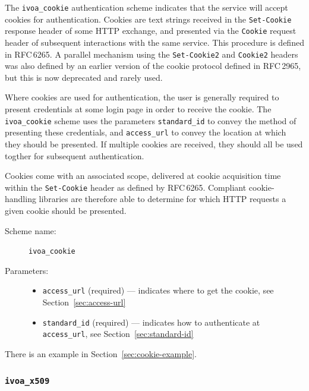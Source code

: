 \documentclass[11pt,a4paper]{ivoa}
\newcommand{\rfc}[1]{RFC\,#1}
\begin{document}
The \verb|ivoa_cookie| authentication scheme indicates that the service
will accept cookies for authentication.
Cookies are text strings received in the {\tt Set-Cookie}
response header of some HTTP exchange,
and presented via the {\tt Cookie} request header of subsequent
interactions with the same service.
This procedure is defined in \rfc{6265}.
A parallel mechanism using the {\tt Set-Cookie2} and {\tt Cookie2}
headers was also defined by an earlier version of the cookie protocol
defined in \rfc{2965}, but this is now deprecated and rarely used.

Where cookies are used for authentication, the user is generally required
to present credentials at some login page in order to receive the cookie.
The \verb|ivoa_cookie| scheme uses the parameters 
\verb|standard_id| to convey the method of presenting these credentials, and
\verb|access_url| to convey the location at which they should be presented.
If multiple cookies are received, they should all be used togther
for subsequent authentication.

Cookies come with an associated scope,
delivered at cookie acquisition time within the {\tt Set-Cookie} header
as defined by \rfc{6265}.
Compliant cookie-handling libraries are therefore able to determine
for which HTTP requests a given cookie should be presented.

\begin{description}
  \item[Scheme name:] \verb|ivoa_cookie|
  \item[Parameters:] \mbox{}
  \begin{itemize}
    \item \verb|access_url| (required) ---
          indicates where to get the cookie,
          see Section~\ref{sec:access-url}
    \item \verb|standard_id| (required) ---
          indicates how to authenticate at \verb|access_url|,
          see Section~\ref{sec:standard-id}
  \end{itemize}
\end{description}

There is an example in Section~\ref{sec:cookie-example}.


\subsubsection{\mbox{\tt ivoa\_x509}}\label{sec:ivoa-x509}

\end{document}
